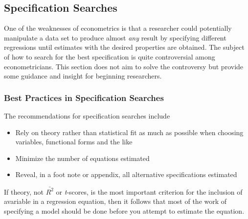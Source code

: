 \documentclass[11pt]{article}
\begin{document}
\subsection{Specification Searches}
One of the weaknesses of econometrics is that a researcher could potentially manipulate a data set to produce almost \textit{any} result by specifying different regressions until estimates with the desired properties are obtained. The subject of how to search for the best specification is quite controversial among econometricians. This section does not aim to solve the controversy but provide some guidance and insight for beginning researchers.
\subsubsection{Best Practices in Specification Searches}
The recommendations for specification searches include
\begin{itemize}
\item Rely on theory rather than statistical fit as much as possible when choosing variables, functional forms and the like
\item Minimize the number of equations estimated
\item Reveal, in a foot note or appendix, all alternative specifications estimated
\end{itemize}
If theory, not $\bar{R^2}$ or \textit{t}-scores, is the most important criterion for the inclusion of avariable in a regression equation, then it follows that most of the work of specifying a model should be done before you attempt to estimate the equation. 
\end{document}
